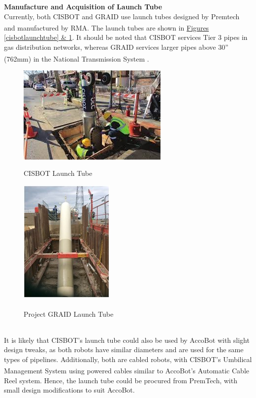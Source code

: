 \documentclass[11pt]{article}		%
\newlength{\imageheight}	 %
\newcommand{\supercite}[1]{\textsuperscript{\cite{#1}}}		%
\begin{document}
            \textbf{Manufacture and Acquisition of Launch Tube}
            \\
            Currently, both CISBOT and GRAID use launch tubes designed by Premtech and manufactured by RMA\supercite{launchtubemfg}. The launch tubes are shown in \hyperref[cisbotlaunchtube]{Figures \ref*{cisbotlaunchtube} \& \ref*{graidlaunchtube}}. It should be noted that CISBOT services Tier 3 pipes in gas distribution networks, whereas GRAID services larger pipes above 30” (762mm) in the National Transmission System \supercite{GRAID}.
		\begin{figure}[h]
				\centering
				\begin{multicols}{2}
				    \includegraphics[height = 0.8\imageheight]{CISBOTlaunchtube.jpg}
    				\caption{CISBOT Launch Tube \cite{CISBOT_project}}
    				\label{cisbotlaunchtube}
    				\columnbreak
    				\includegraphics[height = 0.8\imageheight]{GRAIDlaunchtube.jpg}
    				\caption{Project GRAID Launch Tube\supercite{GRAID}}
    				\label{graidlaunchtube}
				\end{multicols}
			\end{figure}
			\vspace{-0.5cm}
			\\
            \hspace*{3ex}It is likely that CISBOT’s launch tube could also be used by AccoBot with slight design tweaks, as both robots have similar diameters and are used for the same types of pipelines. Additionally, both are cabled robots, with CISBOT’s Umbilical Management System using powered cables\supercite{CISBOTUMS} similar to AccoBot's Automatic Cable Reel system. Hence, the launch tube could be procured from PremTech, with small design modifications to suit AccoBot.
            
\end{document}
